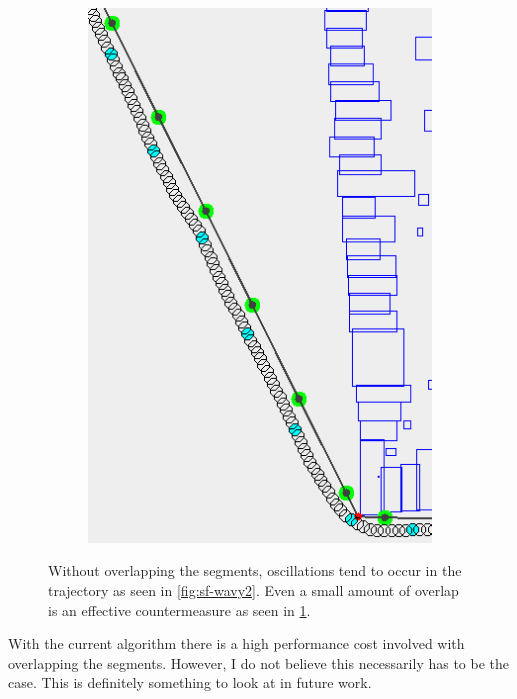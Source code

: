 \begin{figure}[h]
\begin{subfigure}[t]{.4\textwidth}
        		\includegraphics[width=\textwidth]{img/sf-wavy2b}
        		\caption{}
        		\label{fig:sf-wavy2b}
	\end{subfigure}	
	
        
    \caption[The effect of overlapping obstacles on oscillations in the trajectory]{Without overlapping the segments, oscillations tend to occur in the trajectory as seen in \ref{fig:sf-wavy2}. Even a small amount of overlap is an effective countermeasure as seen in \ref{fig:sf-wavy2b}.}
    \label{fig:sf-wavy}
\end{figure}
With the current algorithm there is a high performance cost involved with overlapping the segments. However, I do not believe this necessarily has to be the case. This is definitely something to look at in future work.

